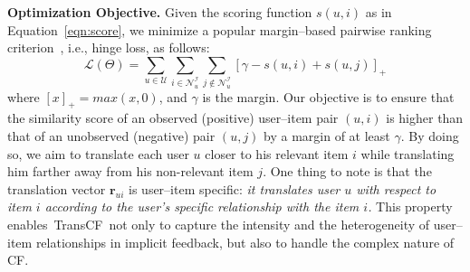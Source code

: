 \documentclass[conference]{IEEEtran}
\newcommand{\propose}{\textsf{{TransCF}}}
\begin{document}
\medskip
\noindent\textbf{Optimization Objective. }
Given the scoring function $s(u,i)$ as in Equation~\ref{eqn:score}, we minimize a popular margin--based pairwise ranking criterion~\cite{hsieh2017collaborative,bordes2013translating,lin2015learning}, i.e., hinge loss, as follows:
\begin{equation}
\label{eqn:obj}
	\mathcal{L}(\Theta) = \sum\limits_{u \in \mathcal{U}} {\sum\limits_{i \in {\mathcal{N}^\mathcal{I}_u}} {\sum\limits_{j \notin {\mathcal{N}^\mathcal{I}_u}} { [{\gamma  - s(u,i) + s(u,j)} ]_{+} } } }
\end{equation}
where $[x]_+ = max(x,0)$, and $\gamma$ is the margin. Our objective is to ensure that the similarity score of an observed (positive) user--item pair $(u,i)$ is higher than that of an unobserved (negative) pair $(u,j)$ by a margin of at least $\gamma$.
By doing so, we aim to translate each user $u$ closer to his relevant item $i$ while translating him farther away from his non-relevant item $j$.
One thing to note is that the translation vector $\bm{r}_{ui}$ is user--item specific: \textit{it translates user $u$ with respect to item $i$ according to the user's specific relationship with the item $i$.}
This property enables~\propose~not only to capture the intensity and the heterogeneity of user--item relationships in implicit feedback, but also to handle the complex nature of CF.
\end{document}
